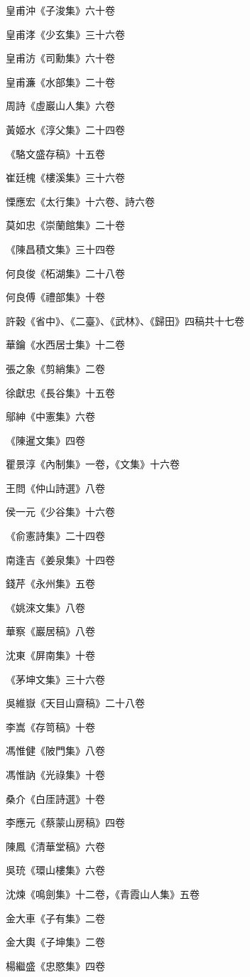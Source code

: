 皇甫沖《子浚集》六十卷

皇甫涍《少玄集》三十六卷

皇甫汸《司勳集》六十卷

皇甫濂《水部集》二十卷

周詩《虛巖山人集》六卷

黃姬水《淳父集》二十四卷

《駱文盛存稿》十五卷

崔廷槐《樓溪集》三十六卷

慄應宏《太行集》十六卷、詩六卷

莫如忠《崇蘭館集》二十卷

《陳昌積文集》三十四卷

何良俊《柘湖集》二十八卷

何良傅《禮部集》十卷

許穀《省中》、《二臺》、《武林》、《歸田》四稿共十七卷

華鑰《水西居士集》十二卷

張之象《剪綃集》二卷

徐獻忠《長谷集》十五卷

鄔紳《中憲集》六卷

《陳暹文集》四卷

瞿景淳《內制集》一卷，《文集》十六卷

王問《仲山詩選》八卷

侯一元《少谷集》十六卷

《俞憲詩集》二十四卷

南逢吉《姜泉集》十四卷

錢芹《永州集》五卷

《姚淶文集》八卷

華察《巖居稿》八卷

沈東《屏南集》十卷

《茅坤文集》三十六卷

吳維嶽《天目山齋稿》二十八卷

李嵩《存笥稿》十卷

馮惟健《陂門集》八卷

馮惟訥《光祿集》十卷

桑介《白厓詩選》十卷

李應元《蔡蒙山房稿》四卷

陳鳳《清華堂稿》六卷

吳珫《環山樓集》六卷

沈煉《鳴劍集》十二卷，《青霞山人集》五卷

金大車《子有集》二卷

金大輿《子坤集》二卷

楊繼盛《忠愍集》四卷

